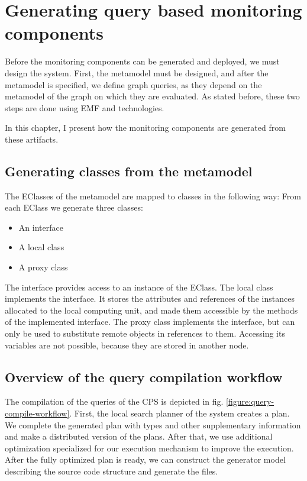 \chapter{Generating query based monitoring components}

Before the monitoring components can be generated and deployed, we must design the system. First, the metamodel must be designed, and after the metamodel is specified, we define graph queries, as they depend on the metamodel of the graph on which they are evaluated. As stated before, these two steps are done using EMF and \viatra{} technologies.

In this chapter, I present how the monitoring components are generated from these artifacts. 

\section{Generating classes from the metamodel}

The EClasses of the metamodel are mapped to \cpp{} classes in the following way: From each EClass we generate three \cpp{} classes:

\begin{itemize}
	\item An interface
	\item A local class
	\item A proxy class
\end{itemize}

The interface provides access to an instance of the EClass. 
The local class implements the interface. It stores the attributes and references of the instances allocated to the local computing unit, and made them accessible by the methods of the implemented interface.
The proxy class implements the interface, but can only be used to substitute remote objects in references to them. Accessing its variables are not possible, because they are stored in another node.

\section{Overview of the query compilation workflow}

The compilation of the queries of the CPS is depicted in fig. \ref{figure:query-compile-workflow}. First, the local search planner of the \viatra{} system creates a plan. We complete the generated plan with types and other supplementary information and make a distributed version of the plans. After that, we use additional optimization specialized for our execution mechanism to improve the execution. After the fully optimized plan is ready, we can construct the generator model describing the source code structure and generate the \cpp{} files.

